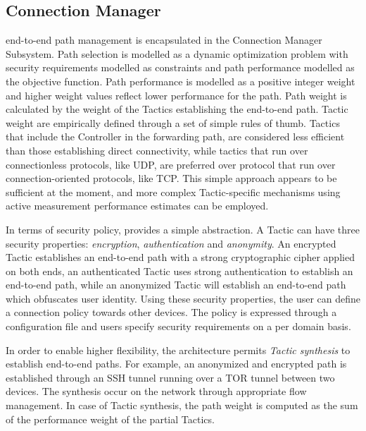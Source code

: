 \subsection{Connection Manager} \label{signpost-engine}

\signpost end-to-end path management is encapsulated in the Connection Manager
Subsystem.  Path selection is modelled as a dynamic optimization problem with
security requirements modelled as constraints and path performance modelled as
the objective function.  Path performance is modelled as a positive integer
weight and higher weight values reflect lower performance for the path. Path
weight is calculated by the weight of the Tactics establishing the end-to-end
path. Tactic weight are empirically defined through a set of simple rules of
thumb. Tactics that include the Controller in the forwarding path, are
considered less efficient than those establishing direct connectivity, while
tactics that run over connectionless protocols, like UDP, are preferred over
protocol that run over connection-oriented protocols, like TCP.
This simple approach appears to be sufficient at
the moment, and more complex Tactic-specific mechanisms using active measurement
performance estimates can be employed. 

In terms of security policy, \signpost provides a simple abstraction. A
\signpost Tactic can have three security properties: \textit{encryption},
\textit{authentication} and \textit{anonymity}.  An encrypted Tactic establishes
an end-to-end path with a strong cryptographic cipher applied on both ends, an
authenticated Tactic uses strong authentication to establish an end-to-end path,
while an anonymized Tactic will establish an end-to-end path which obfuscates
user identity. Using these security properties, the user can define a connection
policy towards other \signpost devices. The policy is expressed through a
configuration file and users specify security requirements on a per domain
basis. 

In order to enable higher flexibility, the \signpost architecture permits {\it Tactic
  synthesis} to establish end-to-end paths. For example, an anonymized and
encrypted path is established through an SSH tunnel running over a TOR tunnel
between two devices. The synthesis occur on the network through appropriate flow
management.  In case of Tactic synthesis, the path weight is computed as the sum
of the performance weight of the partial Tactics. 

